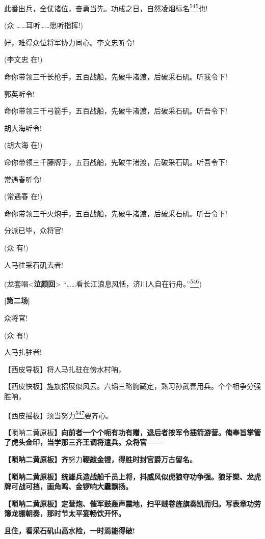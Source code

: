 此番出兵，全仗诸位，奋勇当先。功成之日，自然凌烟标名\protect\hyperlink{fn545}{\textsuperscript{545}}也!

(众 \ldots{}\ldots{}耳听\ldots{}\ldots{}愿听指挥!)

好，难得众位将军协力同心。李文忠听令!

(李文忠 在!)

命你带领三千长枪手，五百战船，先破牛渚渡，后破采石矶。听我令下!

郭英听令!

命你带领三千弓箭手，五百战船，先破牛渚渡，后破采石矶。听吾令下!

胡大海听令!

(胡大海 在!)

命你带领三千藤牌手，五百战船，先破牛渚渡，后破采石矶。听吾令下!

常遇春听令!

(常遇春 在!)

命你带领三千火炮手，五百战船，先破牛渚渡，后破采石矶。听吾令下!

分派已毕，众将官!

(众 有!)

人马往采石矶去者!

(龙套唱\textless{}\textbf{泣颜回}\textgreater{}
``\ldots{}\ldots{}看长江浪息风恬，济川人自在行舟。''\protect\hyperlink{fn546}{\textsuperscript{546}})

\textbf{{[}第二场{]}}

众将官!

(众 有!)

人马扎驻者!

【西皮导板】将人马扎驻在傍水村呐，

【西皮快板】旌旗招展似风云。六韬三略胸藏定，熟习孙武善用兵。个个相争分强胜呐，

【西皮摇板】须当努力\protect\hyperlink{fn547}{\textsuperscript{547}}要齐心。

\textbf{【}唢呐二黄原板\textbf{】向前者一个个呃有功有赠，退后者按军令插箭游营。俺奉旨掌管了虎头金印，当学那三齐王调将遣兵。众将官------}

\textbf{【唢呐二黄原板】齐}努力\textbf{鞭敲金镫，得胜时封官爵万古留名。}

\textbf{【唢呐二黄原板】统雄兵造战船千员上将，抖威风似虎狼夺功争强。狼牙槊、龙虎牌可战可挡，画角鸣、金锣响大纛飘扬。}

\textbf{【唢呐二黄原板】定营炮、催军鼓轰声震地，扫平贼卷旌旗奏凯而归。写表章功劳簿龙棚朝奏，那时节太平宴畅饮开怀。}

\textbf{且住，看采石矶山高水险，一时焉能得破!}

